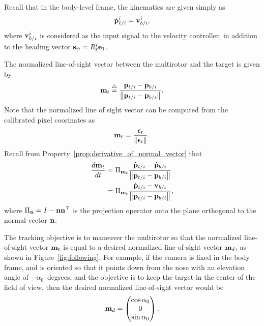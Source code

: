 Recall that in the body-level frame, the kinematics are given simply as
\begin{equation}\label{eq:multirotor_tracking_eom}
\dot{\pbf}_{\ell/i}^i = \vbf_{b/i}^i,
\end{equation}
where $\mathbf{v}_{b/i}^i$ is considered as the input signal to the velocity controller, in addition to the heading vector $\mathbf{s}_{\psi} = R_\ell^i \mathbf{e}_1$.  

The normalized line-of-sight vector between the multirotor and the target is given by
\[
\mathbf{m}_t \stackrel{\triangle}{=} \frac{\mathbf{p}_{t/i} - \mathbf{p}_{b/i}}{\left\|\mathbf{p}_{t/i} - \mathbf{p}_{b/i}\right\|}.
\]
Note that the normalized line of sight vector can be computed from the calibrated pixel coorinates as 
\[
\mathbf{m}_t = \frac{\boldsymbol{\epsilon}_t}{\left\|\boldsymbol{\epsilon}_t\right\|}.
\]
Recall from Property~\ref{prop:derivative_of_normal_vector} that 
\begin{align}
\frac{d\mbf_t}{dt} &= \Pi_{\mbf_t} \frac{\dot{\pbf}_{t/i} - \dot{\pbf}_{b/i}}{\norm{\pbf_{t/i} - \pbf_{b/i}}} \notag \\
	&= \Pi_{\mbf_t} \frac{\dot{\pbf}_{t/i} - \vbf_{b/i}}{\norm{\pbf_{t/i} - \pbf_{b/i}}}, \label{eq:mbf_t_dot}
\end{align}
where $\Pi_{\mathbf{n}} = I-\mathbf{n}\mathbf{n}^\top$ is the projection operator onto the plane orthogonal to the normal vector $\mathbf{n}$.  


The tracking objective is to maneuver the multirotor so that the normalized line-of-sight vector $\mathbf{m}_t$ is equal to a desired normalized line-of-sight vector $\mathbf{m}_d$, as shown in Figure~\ref{fig:following}.  For example, if the camera is fixed in the body frame, and is oriented so that it points down from the nose with an elevation angle of $-\alpha_0$~degrees, and the objective is to keep the target in the center of the field of view, then the desired normalized line-of-sight vector would be
\[
\mathbf{m}_d = \begin{pmatrix} \cos\alpha_0 \\ 0 \\ \sin\alpha_0 \end{pmatrix}.
\]

